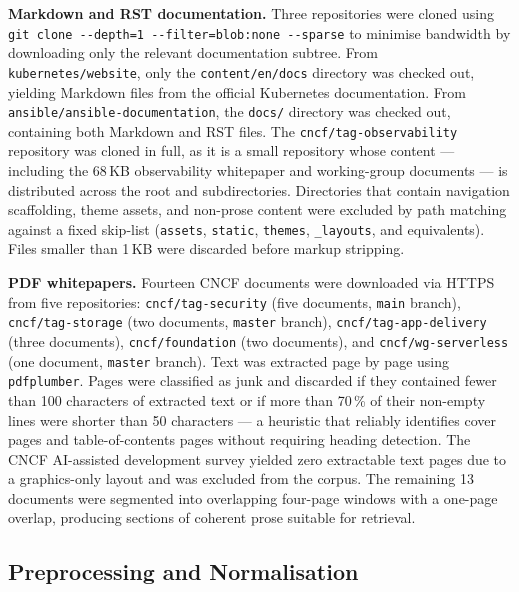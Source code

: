 \textbf{Markdown and RST documentation.} Three repositories were cloned using \texttt{git clone \texttt{-{}-}depth=1 \texttt{-{}-}filter=blob:none \texttt{-{}-}sparse} to minimise bandwidth by downloading only the relevant documentation subtree. From \texttt{kubernetes/website}, only the \texttt{content/en/docs} directory was checked out, yielding Markdown files from the official Kubernetes documentation. From \texttt{ansible/ansible-documentation}, the \texttt{docs/} directory was checked out, containing both Markdown and RST files. The \texttt{cncf/tag-observability} repository was cloned in full, as it is a small repository whose content — including the 68\,KB observability whitepaper and working-group documents — is distributed across the root and subdirectories. Directories that contain navigation scaffolding, theme assets, and non-prose content were excluded by path matching against a fixed skip-list (\texttt{assets}, \texttt{static}, \texttt{themes}, \texttt{\_layouts}, and equivalents). Files smaller than 1\,KB were discarded before markup stripping.

\textbf{PDF whitepapers.} Fourteen CNCF documents were downloaded via HTTPS from five repositories: \texttt{cncf/tag-security} (five documents, \texttt{main} branch), \texttt{cncf/tag-storage} (two documents, \texttt{master} branch), \texttt{cncf/tag-app-delivery} (three documents), \texttt{cncf/foundation} (two documents), and \texttt{cncf/wg-serverless} (one document, \texttt{master} branch). Text was extracted page by page using \texttt{pdfplumber}. Pages were classified as junk and discarded if they contained fewer than 100 characters of extracted text or if more than 70\,\% of their non-empty lines were shorter than 50 characters — a heuristic that reliably identifies cover pages and table-of-contents pages without requiring heading detection. The CNCF AI-assisted development survey yielded zero extractable text pages due to a graphics-only layout and was excluded from the corpus. The remaining 13 documents were segmented into overlapping four-page windows with a one-page overlap, producing sections of coherent prose suitable for retrieval.

\subsection{Preprocessing and Normalisation}

